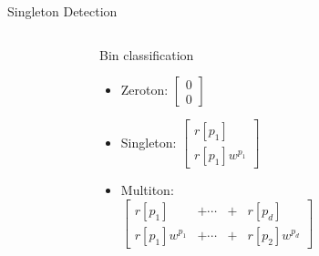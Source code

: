 \documentclass[10pt,xcolor=table]{beamer}
\begin{document}
	\begin{frame}{Singleton Detection}
			
		
			\vspace{-5pt}
			\begin{columns}
			\begin{figure}[t]
				\begin{center}
					\resizebox{0.8\textwidth}{!}{}
				\end{center}
			\end{figure}
				\begin{block}{Bin classification}
					\begin{itemize}
						\item \alert{Zeroton}: 
						\vspace{3pt}
						$\begin{bmatrix}
							0 \\
							0 
						\end{bmatrix}$
						\item \alert{Singleton:}
						\vspace{3pt}
						$
						\begin{bmatrix}
						r[p_1] \\
						r[p_1]w^{p_1}
						\end{bmatrix}$
						
						\item \alert{Multiton:}\\
						\vspace{7pt}
						$
						\begin{bmatrix}
						r[p_1]&+ \cdots &+&r[p_d] \\
						r[p_1]w^{p_1}&+\cdots &+&r[p_2]w^{p_d}
						\end{bmatrix}$
					\end{itemize}
				\end{block}
				

\end{columns}
\end{frame}
\end{document}
